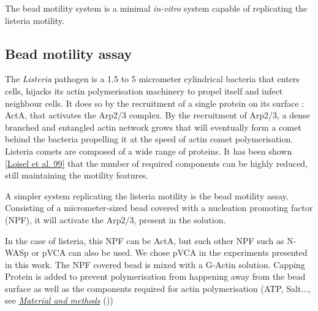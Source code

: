 \documentclass[A4paperpaper,11pt,english]{sphinxmanual}
\begin{document}
The bead motility system is a minimal \emph{in-vitro} system capable of replicating
the listeria motility.


\subsection{Bead motility assay}
\label{index-latex:id49}\label{index-latex:bead-motility-assay}
The \emph{Listeria} pathogen is a 1.5 to 5 micrometer cylindrical bacteria that
enters cells, hijacks its actin polymerisation machinery to propel itself and
infect neighbour cells. It does so by the recruitment of a single protein on its
surface : ActA, that activates the Arp2/3 complex. By the recruitment of Arp2/3, a
dense branched and entangled actin network grows that will eventually form a
comet behind the bacteria propelling it at the speed of actin comet
polymerisation. Listeria comets are composed of a wide range of proteins. It has
been shown {\hyperref[index-latex:loisel1999]{{[}Loisel et al. 99{]}}} that the number of required components can
be highly reduced, still maintaining the motility features.

A simpler system replicating the listeria motility is the bead motility assay.
Consisting of a micrometer-sized bead covered with a nucleation promoting factor (NPF), it will activate the Arp2/3, present in the solution.

In the case of listeria, this NPF can be ActA, but such other NPF such as N-WASp or pVCA can also be used.
We chose pVCA in the experiments presented in this work. The NPF covered
bead is mixed with a G-Actin solution. Capping Protein is added to prevent
polymerisation from happening away from the bead surface as well as the
components required for actin polymerisation (ATP, Salt..., see {\hyperref[index-latex:m-et-m]{\emph{Material and methods}}} ())
\end{document}
